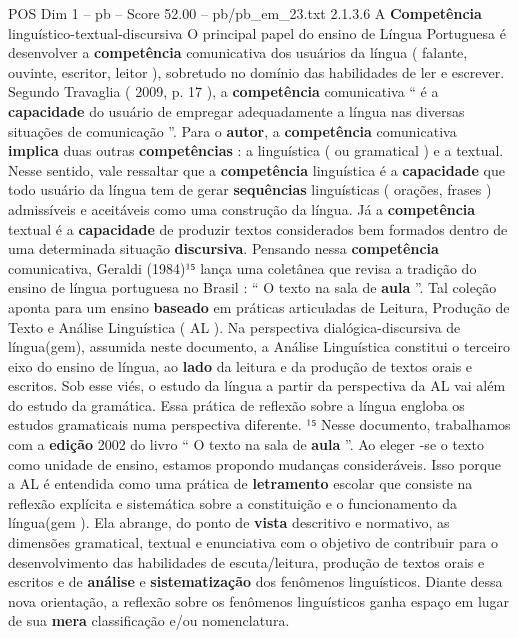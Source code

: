 \begin{textsample}{POS Dim 1 – pb – Score 52.00 – pb/pb\_em\_23.txt}  \label{ex:f1_pos_148}
2.1.3.6 A \textbf{Competência} linguístico-textual-discursiva O principal papel do ensino de Língua Portuguesa é desenvolver a \textbf{competência} comunicativa dos usuários da língua ( falante, ouvinte, escritor, leitor ), sobretudo no domínio das habilidades de ler e escrever.
Segundo Travaglia ( 2009, p. 17 ), a \textbf{competência} comunicativa “ é a \textbf{capacidade} do usuário de empregar adequadamente a língua nas diversas situações de comunicação ”.
Para o \textbf{autor}, a \textbf{competência} comunicativa \textbf{implica} duas outras \textbf{competências} : a linguística ( ou gramatical ) e a textual.
Nesse sentido, vale ressaltar que a \textbf{competência} linguística é a \textbf{capacidade} que todo usuário da língua tem de gerar \textbf{sequências} linguísticas ( orações, frases ) admissíveis e aceitáveis como uma construção da língua.
Já a \textbf{competência} textual é a \textbf{capacidade} de produzir textos considerados bem formados dentro de uma determinada situação \textbf{discursiva}.
Pensando nessa \textbf{competência} comunicativa, Geraldi (1984)¹⁵ lança uma coletânea que revisa a tradição do ensino de língua portuguesa no Brasil : “ O texto na sala de \textbf{aula} ”.
Tal coleção aponta para um ensino \textbf{baseado} em práticas articuladas de Leitura, Produção de Texto e Análise Linguística ( AL ).
Na perspectiva dialógica-discursiva de língua(gem), assumida neste documento, a Análise Linguística constitui o terceiro eixo do ensino de língua, ao \textbf{lado} da leitura e da produção de textos orais e escritos.
Sob esse viés, o estudo da língua a partir da perspectiva da AL vai além do estudo da gramática.
Essa prática de reflexão sobre a língua engloba os estudos gramaticais numa perspectiva diferente. ¹⁵ Nesse documento, trabalhamos com a \textbf{edição} 2002 do livro “ O texto na sala de \textbf{aula} ”.
Ao eleger -se o texto como unidade de ensino, estamos propondo mudanças consideráveis.
Isso porque a AL é entendida como uma prática de \textbf{letramento} escolar que consiste na reflexão explícita e sistemática sobre a constituição e o funcionamento da língua(gem ).
Ela abrange, do ponto de \textbf{vista} descritivo e normativo, as dimensões gramatical, textual e enunciativa com o objetivo de contribuir para o desenvolvimento das habilidades de escuta/leitura, produção de textos orais e escritos e de \textbf{análise} e \textbf{sistematização} dos fenômenos linguísticos.
Diante dessa nova orientação, a reflexão sobre os fenômenos linguísticos ganha espaço em lugar de sua \textbf{mera} classificação e/ou nomenclatura.

\end{textsample}
